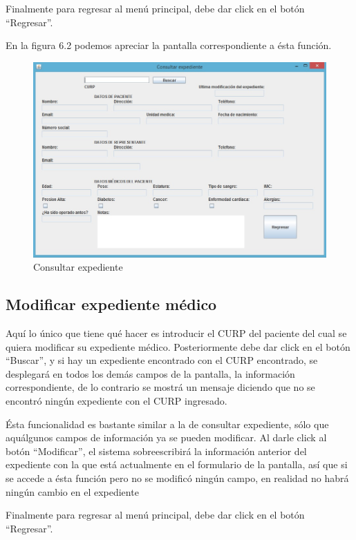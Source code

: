 Finalmente para regresar al men\'u principal, debe dar click en el bot\'on "`Regresar"'.

En la figura 6.2 podemos apreciar la pantalla correspondiente a \'esta funci\'on.

\begin{figure}[htbp!]
		\centering		
	\end{figure}
\begin{figure}[htbp!]
\centering
		\includegraphics[width=.8\textwidth]{images/gui/IUConsultaExp}
		\caption{Consultar expediente}
\end{figure}
\subsection{Modificar expediente m\'edico}
Aqu\'i lo \'unico que tiene qu\'e hacer es introducir el CURP del paciente del cual se quiera modificar su expediente m\'edico. Posteriormente debe dar click en el bot\'on "`Buscar"', y si hay un expediente encontrado con el CURP encontrado, se desplegar\'a en todos los dem\'as campos de la pantalla, la informaci\'on correspondiente, de lo contrario se mostr\'a un mensaje diciendo que no se encontr\'o ning\'un expediente con el CURP ingresado.

\'Esta funcionalidad es bastante similar a la de consultar expediente, s\'olo que aqu\' algunos campos de informaci\'on ya se pueden modificar. Al darle click al bot\'on "`Modificar"', el sistema sobreescribir\'a la informaci\'on anterior del expediente con la que est\'a actualmente en el formulario de la pantalla, as\'i que si se accede a \'esta funci\'on pero no se modific\'o ning\'un campo, en realidad no habr\'a ning\'un cambio en el expediente

Finalmente para regresar al men\'u principal, debe dar click en el bot\'on "`Regresar"'.

